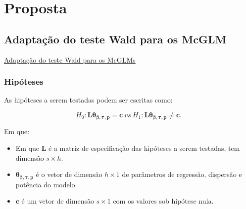 \documentclass[10pt,
  aspectratio=169,
  serif,
  mathserif,
  professionalfont,
  compress,
  handout,
  ]{beamer}\usepackage[]{graphicx}\usepackage[]{color}
\begin{document}

\section{Proposta}


\subsection{Adaptação do teste Wald para os McGLM}


\begin{frame}[c, allowframebreaks]

\begin{center}

  {\normalsize \href{https://lineu96.github.io/st/}{Adaptação do teste Wald para os McGLMs}}
  
\end{center}

\end{frame}


\begin{frame}
\frametitle{Hipóteses}

As hipóteses a serem testadas podem ser escritas como:

$$H_0: \boldsymbol{L}\boldsymbol{\theta_{\beta,\tau,p}} = \boldsymbol{c} \ vs \ H_1: \boldsymbol{L}\boldsymbol{\theta_{\beta,\tau,p}} \neq \boldsymbol{c}.$$ 

Em que: 

\begin{itemize}
  
  \item Em que $\boldsymbol{L}$ é a matriz de especificação das hipóteses a serem testadas, tem dimensão $s \times h$. 
  
  \item $\boldsymbol{\theta_{\beta,\tau,p}}$ é o vetor de dimensão $h \times 1$ de parâmetros de regressão, dispersão e potência do modelo. 
  
  \item $\boldsymbol{c}$ é um vetor de dimensão $s \times 1$ com os valores sob hipótese nula.

\end{itemize}

\end{frame}
\end{document}
